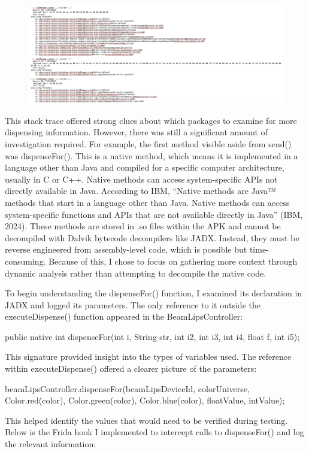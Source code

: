 \begin{figure}
	\centering
	\includegraphics[width=0.7\linewidth]{hooked_payload}
	\caption{}
	\label{fig:hookedpayload}
\end{figure}

This stack trace offered strong clues about which packages to examine for more dispensing information. However, there was still a significant amount of investigation required. For example, the first method visible aside from send() was dispenseFor(). This is a native method, which means it is implemented in a language other than Java and compiled for a specific computer architecture, usually in C or C++. Native methods can access system-specific APIs not directly available in Java. According to IBM, “Native methods are Java™ methods that start in a language other than Java. Native methods can access system-specific functions and APIs that are not available directly in Java” (IBM, 2024). These methods are stored in .so files within the APK and cannot be decompiled with Dalvik bytecode decompilers like JADX. Instead, they must be reverse engineered from assembly-level code, which is possible but time-consuming. Because of this, I chose to focus on gathering more context through dynamic analysis rather than attempting to decompile the native code.  

To begin understanding the dispenseFor() function, I examined its declaration in JADX and logged its parameters. The only reference to it outside the executeDispense() function appeared in the BeamLipsController:

public native int dispenseFor(int i, String str, int i2, int i3, int i4, float f, int i5);

This signature provided insight into the types of variables used. The reference within executeDispense() offered a clearer picture of the parameters:

beamLipsController.dispenseFor(beamLipsDeviceId, colorUniverse, Color.red(color), Color.green(color), Color.blue(color), floatValue, intValue);

This helped identify the values that would need to be verified during testing. Below is the Frida hook I implemented to intercept calls to dispenseFor() and log the relevant information:

